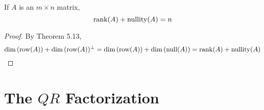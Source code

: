 \begin{corollary}
	If $A$ is an $m \times n$ matrix, \begin{equation*}
		\textnormal{rank}(A) + \textnormal{nullity}(A) = n
	\end{equation*}
\end{corollary}
\begin{proof}
	By Theorem 5.13, \begin{equation*}
		\dim{(\textnormal{row}(A))} + \dim{(\textnormal{row}(A))^\perp} = \dim{(\textnormal{row}(A))} + \dim{(\textnormal{null}(A))} = \textnormal{rank}(A) + \textnormal{nullity}(A)
	\end{equation*}
\end{proof}

\newpage
\section{The $ QR $ Factorization}

